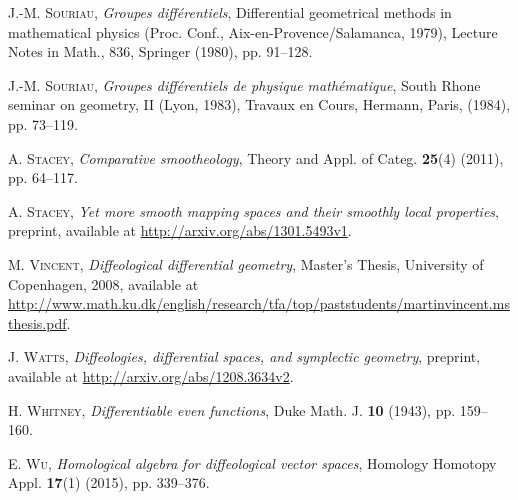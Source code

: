 \documentclass{amsart}
\theoremstyle{remark}
\begin{document}
\begin{thebibliography}{CSW}

     {\scshape J.-M. Souriau},
    \emph{Groupes diff\'erentiels},
    Differential geometrical methods in mathematical physics
    (Proc. Conf., Aix-en-Provence/Salamanca, 1979),
    Lecture Notes in Math., 836, Springer (1980), pp. 91--128.

     {\scshape J.-M. Souriau},
    \emph{Groupes diff\'erentiels de physique math\'ematique},
    South Rhone seminar on geometry, II (Lyon, 1983),
    Travaux en Cours, Hermann, Paris, (1984), pp. 73--119.


     {\scshape A. Stacey},
    \emph{Comparative smootheology},
    Theory and Appl. of Categ. \textbf{25}(4) (2011), pp. 64--117.

     {\scshape A. Stacey},
    \emph{Yet more smooth mapping spaces and their smoothly local properties},
    preprint, available at \url{http://arxiv.org/abs/1301.5493v1}.


     {\scshape M. Vincent},
    \emph{Diffeological differential geometry},
    Master's Thesis, University of Copenhagen, 2008,
    available at
    \url{http://www.math.ku.dk/english/research/tfa/top/paststudents/martinvincent.msthesis.pdf}.


     {\scshape J. Watts},
    \emph{Diffeologies, differential spaces, and symplectic geometry},
    preprint, available at \url{http://arxiv.org/abs/1208.3634v2}.

%
%
%

     {\scshape H. Whitney},
    \emph{Differentiable even functions},
    Duke Math. J. \textbf{10} (1943), pp. 159--160.

     {\scshape E. Wu},
    \emph{Homological algebra for diffeological vector spaces},
    Homology Homotopy Appl. \textbf{17}(1) (2015), pp. 339--376.

\end{thebibliography}
\vspace*{10pt} %
\end{document}
